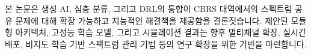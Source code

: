 본 논문은 생성 AI, 심층 분류, 그리고 DRL의 통합이 CBRS 대역에서의 스펙트럼 공유 문제에 대해 확장 가능하고 지능적인 해결책을 제공함을 결론짓습니다. 제안된 모듈형 아키텍처, 
고성능 학습 모델, 그리고 시뮬레이션 결과는 향후 멀티채널 확장, 실시간 배포, 비지도 학습 기반 스펙트럼 관리 기법 등의 연구 확장을 위한 기반을 마련합니다.

